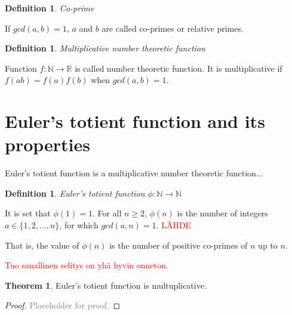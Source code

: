 \documentclass{article}
\theoremstyle{definition}
\newtheorem{definition}[subsubsection]{Definition}
\newtheorem{theorem}[subsubsection]{Theorem}
\begin{document}
\begin{definition}{\emph{Co-prime}}

If $gcd(a,b) = 1$, $a$ and $b$ are called co-primes or relative primes.

\end{definition}

\begin{definition}{\emph{Multiplicative number theoretic function}}

Function $f: \mathbb{N} \rightarrow \mathbb{R}$ is called number theoretic function. It is multiplicative if $f(ab) = f(a)f(b)$ when $gcd(a, b)=1$.

\end{definition}

\section{Euler's totient function and its properties}

Euler's totient function is a multiplicative number theoretic function...

\begin{definition}{\emph{Euler's totient function $\phi: \mathbb{N} \rightarrow \mathbb{N}$}}

It is set that $\phi(1) = 1$. For all $n \geq 2$, $\phi(n)$ is the number of integers $a \in \{1,2,...,n\}$, for which $gcd(a,n) = 1$.
\textcolor{red}{LÄHDE}

\end{definition}


That is, the value of $\phi(n)$ is the number of positive co-primes of $n$ up to $n$.

\textcolor{red}{Tuo sanallinen selitys on yhä hyvin onneton.}

\begin{theorem}
Euler's totient function is multuplicative.
\begin{proof}
\textcolor{gray}{Placeholder for proof.}
\end{proof}
\end{theorem}
\end{document}
